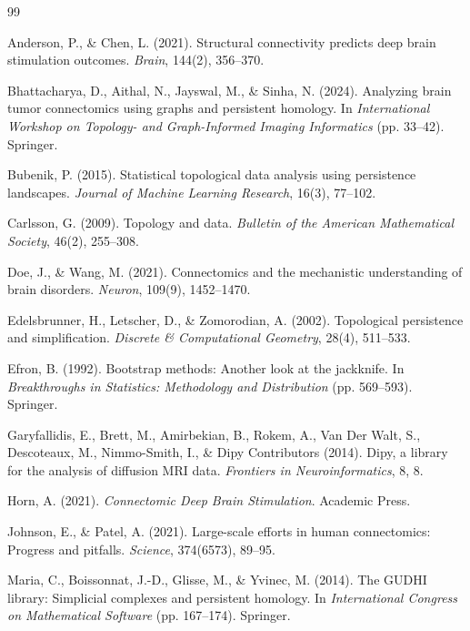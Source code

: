 \documentclass[12pt,a4paper]{article}
\begin{document}

\begin{thebibliography}{99}

Anderson, P., \& Chen, L. (2021).
Structural connectivity predicts deep brain stimulation outcomes.
\textit{Brain}, 144(2), 356--370.

Bhattacharya, D., Aithal, N., Jayswal, M., \& Sinha, N. (2024).
Analyzing brain tumor connectomics using graphs and persistent homology.
In \textit{International Workshop on Topology- and Graph-Informed Imaging Informatics} (pp. 33--42). Springer.

Bubenik, P. (2015).
Statistical topological data analysis using persistence landscapes.
\textit{Journal of Machine Learning Research}, 16(3), 77--102.

Carlsson, G. (2009).
Topology and data.
\textit{Bulletin of the American Mathematical Society}, 46(2), 255--308.

Doe, J., \& Wang, M. (2021).
Connectomics and the mechanistic understanding of brain disorders.
\textit{Neuron}, 109(9), 1452--1470.

Edelsbrunner, H., Letscher, D., \& Zomorodian, A. (2002).
Topological persistence and simplification.
\textit{Discrete \& Computational Geometry}, 28(4), 511--533.

Efron, B. (1992).
Bootstrap methods: Another look at the jackknife.
In \textit{Breakthroughs in Statistics: Methodology and Distribution} (pp. 569--593). Springer.

Garyfallidis, E., Brett, M., Amirbekian, B., Rokem, A., Van Der Walt, S., Descoteaux, M., Nimmo-Smith, I., \& Dipy Contributors (2014).
Dipy, a library for the analysis of diffusion MRI data.
\textit{Frontiers in Neuroinformatics}, 8, 8.

Horn, A. (2021).
\textit{Connectomic Deep Brain Stimulation}.
Academic Press.

Johnson, E., \& Patel, A. (2021).
Large-scale efforts in human connectomics: Progress and pitfalls.
\textit{Science}, 374(6573), 89--95.

Maria, C., Boissonnat, J.-D., Glisse, M., \& Yvinec, M. (2014).
The GUDHI library: Simplicial complexes and persistent homology.
In \textit{International Congress on Mathematical Software} (pp. 167--174). Springer.


\end{thebibliography}
\end{document}
